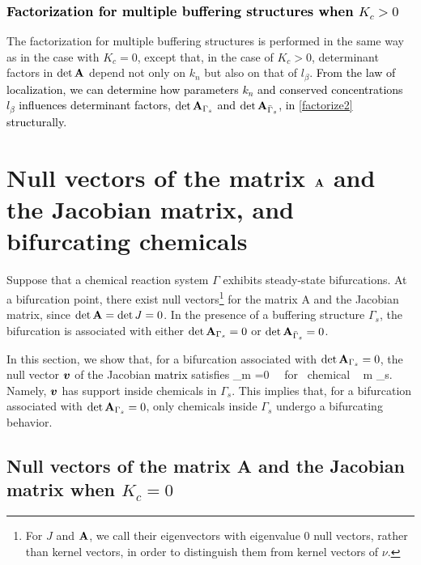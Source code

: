 \documentclass[ amsmath,amssymb,nofootinbib
]{revtex4-1}
\def\bal#1\eal{\begin{align}#1\end{align}}
\def\mbf#1{\mbox{\boldmath $#1$}}
\newcommand{\detA}{{\rm det}\,  {\bf A}}
\newcommand{\gs}{{\Gamma_s}}
\newcommand{\gbs}{{\bar{\Gamma}_s}}
\newcommand{\red}[1]{\textcolor{black}{#1}}
\newcommand{\corr}[1]{\textcolor{black}{#1}}
\newcommand{\green}[1]{\textcolor{black}{#1}}
\begin{document}
\subsubsection{\red{Factorization for multiple buffering structures when $K_c  >0$}}

The factorization for multiple buffering structures is  performed in the same way as in the case with $K_c=0$, except that, in the case of $K_c>0$,  determinant factors in $\detA$ depend not only on  $k_n$ but also on that of $l_\beta$. \corr{From the law of localization, we can determine 
\green{how} parameters $k_n$ and conserved concentrations $l_\beta$ influences determinant factors, \green{$\det {\bf A}_{\Gamma_s}$ and $\det {\bf A}_{\bar \Gamma_s}$},  in \eqref{factorize2} structurally.}
\section{Null vectors of  the matrix ${\bf A}$ and  the Jacobian matrix, and bifurcating chemicals}


Suppose that  a chemical reaction system $\Gamma$  exhibits  steady-state bifurcations.
At a bifurcation point,  there exist null vectors\footnote{For  $J$ and $\bf A$, we call their eigenvectors with eigenvalue 0 null vectors, rather than kernel vectors, in order to distinguish them from  kernel vectors of $\nu$. } for the matrix {\rm A} and the Jacobian matrix, since $\detA = {\rm det}\, J =0 $.
In the presence of a buffering structure $\Gamma_s$,  the bifurcation is associated with either $\detA_\gs=0$ or $\detA_\gbs=0$.

In this section,  we show that, for a bifurcation  associated with $\detA_\gs=0$, the null vector ${\mbf v}$ of the Jacobian \red{matrix}
satisfies
\bal
v_m =0  \ {\rm  \ for }\  {\rm chemical \ }  m \in {\bar \Gamma}_s. \label{vm=0}
\eal
Namely,  ${\mbf v}$  has support inside  chemicals in $\Gamma_s$. This implies that, for a bifurcation  associated with $\detA_{\Gamma_s} =0$, only chemicals  inside $\Gamma_s$ undergo a bifurcating behavior.


\subsection{Null vectors of the matrix {\bf A} and the Jacobian matrix when $K_c =0$}
\end{document}
